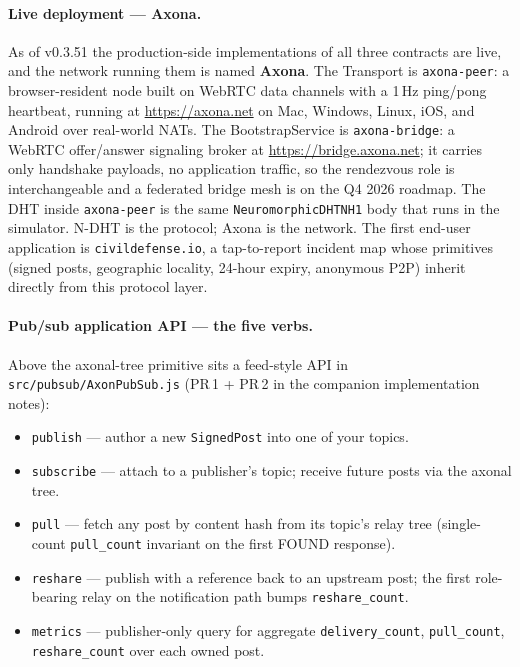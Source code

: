 \documentclass[twoside,nobib]{tufte-book}
\newcommand{\NDHT}{N-DHT\xspace}
\begin{document}
\paragraph{Live deployment --- Axona.}
As of v0.3.51 the production-side implementations of all three
contracts are live, and the network running them is named
\textbf{Axona}. The Transport is \texttt{axona-peer}: a
browser-resident node built on WebRTC data channels with a
1\,Hz ping/pong heartbeat, running at
\url{https://axona.net} on Mac, Windows, Linux, iOS, and
Android over real-world NATs. The BootstrapService is
\texttt{axona-bridge}: a WebRTC offer/answer signaling broker
at \url{https://bridge.axona.net}; it carries only handshake
payloads, no application traffic, so the rendezvous role is
interchangeable and a federated bridge mesh is on the Q4 2026
roadmap. The DHT inside \texttt{axona-peer} is the same
\texttt{NeuromorphicDHTNH1} body that runs in the simulator.
\NDHT is the protocol; Axona is the network. The first
end-user application is \texttt{civildefense.io}, a
tap-to-report incident map whose primitives (signed posts,
geographic locality, 24-hour expiry, anonymous P2P) inherit
directly from this protocol layer.

\paragraph{Pub/sub application API --- the five verbs.}
Above the axonal-tree primitive sits a feed-style API in
\texttt{src/pubsub/AxonPubSub.js} (PR\,1 + PR\,2 in the
companion implementation notes):

\begin{itemize}\itemsep2pt
\item \texttt{publish} --- author a new \texttt{SignedPost}
  into one of your topics.
\item \texttt{subscribe} --- attach to a publisher's topic;
  receive future posts via the axonal tree.
\item \texttt{pull} --- fetch any post by content hash from
  its topic's relay tree (single-count \texttt{pull\_count}
  invariant on the first FOUND response).
\item \texttt{reshare} --- publish with a reference back to
  an upstream post; the first role-bearing relay on the
  notification path bumps \texttt{reshare\_count}.
\item \texttt{metrics} --- publisher-only query for aggregate
  \texttt{delivery\_count}, \texttt{pull\_count},
  \texttt{reshare\_count} over each owned post.
\end{itemize}
\end{document}
